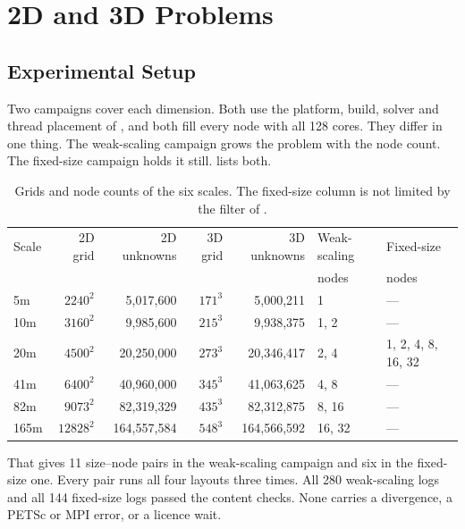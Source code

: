 \documentclass[12pt,a4paper,notitlepage]{report}
\begin{document}
\chapter{2D and 3D Problems}
\label{ch:multinode}

\section{Experimental Setup}
\label{sec:mn-setup}
Two campaigns cover each dimension. Both use the platform, build, solver and thread
placement of , and both fill every node with all 128 cores. They
differ in one thing. The weak-scaling campaign grows the problem with the node count. The
fixed-size campaign holds it still.  lists both.

\begin{table}[htbp]
  \centering
  \caption{Grids and node counts of the six scales. The fixed-size column is not limited by the
  filter of .}
  \label{tab:fullnode-matrix}
  \small
  \begin{tabular}{lrrrrll}
    \toprule
    Scale & 2D grid & 2D unknowns & 3D grid & 3D unknowns & Weak-scaling & Fixed-size \\
          &         &             &         &             & nodes        & nodes \\
    \midrule
    5m   & $2240^2$  &   5,017,600 & $171^3$ &   5,000,211 & 1      & --- \\
    10m  & $3160^2$  &   9,985,600 & $215^3$ &   9,938,375 & 1, 2   & --- \\
    20m  & $4500^2$  &  20,250,000 & $273^3$ &  20,346,417 & 2, 4   & 1, 2, 4, 8, 16, 32 \\
    41m  & $6400^2$  &  40,960,000 & $345^3$ &  41,063,625 & 4, 8   & --- \\
    82m  & $9073^2$  &  82,319,329 & $435^3$ &  82,312,875 & 8, 16  & --- \\
    165m & $12828^2$ & 164,557,584 & $548^3$ & 164,566,592 & 16, 32 & --- \\
    \bottomrule
  \end{tabular}
\end{table}

That gives 11 size--node pairs in the weak-scaling campaign and six in the fixed-size one.
Every pair runs all four layouts three times. All 280 weak-scaling logs and all 144
fixed-size logs passed the content checks. None carries a divergence, a PETSc or MPI
error, or a licence wait.
\end{document}
